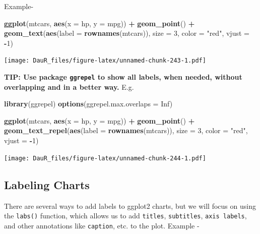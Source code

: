 \documentclass[
]{book}
\newenvironment{Shaded}{\begin{snugshade}}{\end{snugshade}}
\newcommand{\AttributeTok}[1]{\textcolor[rgb]{0.13,0.29,0.53}{#1}}
\newcommand{\ConstantTok}[1]{\textcolor[rgb]{0.56,0.35,0.01}{#1}}
\newcommand{\DecValTok}[1]{\textcolor[rgb]{0.00,0.00,0.81}{#1}}
\newcommand{\FunctionTok}[1]{\textcolor[rgb]{0.13,0.29,0.53}{\textbf{#1}}}
\newcommand{\NormalTok}[1]{#1}
\newcommand{\SpecialCharTok}[1]{\textcolor[rgb]{0.81,0.36,0.00}{\textbf{#1}}}
\newcommand{\StringTok}[1]{\textcolor[rgb]{0.31,0.60,0.02}{#1}}
\begin{document}
Example-

\begin{Shaded}
\begin{Highlighting}[]
\FunctionTok{ggplot}\NormalTok{(mtcars, }\FunctionTok{aes}\NormalTok{(}\AttributeTok{x =}\NormalTok{ hp, }\AttributeTok{y =}\NormalTok{ mpg)) }\SpecialCharTok{+}
  \FunctionTok{geom\_point}\NormalTok{() }\SpecialCharTok{+}
  \FunctionTok{geom\_text}\NormalTok{(}\FunctionTok{aes}\NormalTok{(}\AttributeTok{label =} \FunctionTok{rownames}\NormalTok{(mtcars)),}
            \AttributeTok{size =} \DecValTok{3}\NormalTok{,}
            \AttributeTok{color =} \StringTok{"red"}\NormalTok{,}
            \AttributeTok{vjust =} \SpecialCharTok{{-}}\DecValTok{1}\NormalTok{)}
\end{Highlighting}
\end{Shaded}

\texttt{[image: DauR\_files/figure-latex/unnamed-chunk-243-1.pdf]}

\textbf{TIP: Use package \texttt{ggrepel} to show all labels, when needed, without overlapping and in a better way.} E.g.

\begin{Shaded}
\begin{Highlighting}[]
\FunctionTok{library}\NormalTok{(ggrepel)}
\FunctionTok{options}\NormalTok{(}\AttributeTok{ggrepel.max.overlaps =} \ConstantTok{Inf}\NormalTok{)}

\FunctionTok{ggplot}\NormalTok{(mtcars, }\FunctionTok{aes}\NormalTok{(}\AttributeTok{x =}\NormalTok{ hp, }\AttributeTok{y =}\NormalTok{ mpg)) }\SpecialCharTok{+}
  \FunctionTok{geom\_point}\NormalTok{() }\SpecialCharTok{+}
  \FunctionTok{geom\_text\_repel}\NormalTok{(}\FunctionTok{aes}\NormalTok{(}\AttributeTok{label =} \FunctionTok{rownames}\NormalTok{(mtcars)),}
            \AttributeTok{size =} \DecValTok{3}\NormalTok{,}
            \AttributeTok{color =} \StringTok{"red"}\NormalTok{,}
            \AttributeTok{vjust =} \SpecialCharTok{{-}}\DecValTok{1}\NormalTok{)}
\end{Highlighting}
\end{Shaded}

\texttt{[image: DauR\_files/figure-latex/unnamed-chunk-244-1.pdf]}

\hypertarget{labeling-charts}{%
\subsection{Labeling Charts}\label{labeling-charts}}

There are several ways to add labels to ggplot2 charts, but we will focus on using the \texttt{labs()} function, which allows us to add \texttt{titles}, \texttt{subtitles}, \texttt{axis\ labels}, and other annotations like \texttt{caption}, etc. to the plot. Example -
\end{document}
